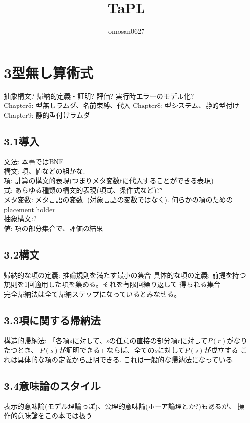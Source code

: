 \documentclass[a4paper,10pt]{article}
\title{TaPL}
\author{omosan0627}
\begin{document}
\maketitle

\section*{3型無し算術式}
抽象構文? 帰納的定義・証明? 評価? 実行時エラーのモデル化?\\
Chapter5: 型無しラムダ、名前束縛、代入 Chapter8: 型システム、静的型付け\\
Chapter9: 静的型付けラムダ\\
\subsection*{3.1導入}
文法: 本書ではBNF\\
構文: 項、値などの組かな.\\
項: 計算の構文的表現(つまりメタ変数tに代入することができる表現)\\
式: あらゆる種類の構文的表現(項式、条件式など)??\\
メタ変数: メタ言語の変数. (対象言語の変数ではなく). 何らかの項のためのplacement holder\\
抽象構文:?\\
値: 項の部分集合で、評価の結果\\
\subsection*{3.2構文}
帰納的な項の定義: 推論規則を満たす最小の集合
具体的な項の定義: 前提を持つ規則を1回適用した項を集める。それを有限回繰り返して
得られる集合\\
完全帰納法は全て帰納ステップになっているとみなせる。\\
\subsection*{3.3項に関する帰納法}
構造的帰納法:
「各項$s$に対して、$s$の任意の直接の部分項$r$に対して$P(r)$がなりたつとき、
$P(s)$が証明できる」ならば、全ての$s$に対して$P(s)$が成立する
これは具体的な項の定義から証明できる. これは一般的な帰納法になっている.
\subsection*{3.4意味論のスタイル}
表示的意味論(モデル理論っぽ)、公理的意味論(ホーア論理とか?)もあるが、
操作的意味論をこの本では扱う
\end{document}
